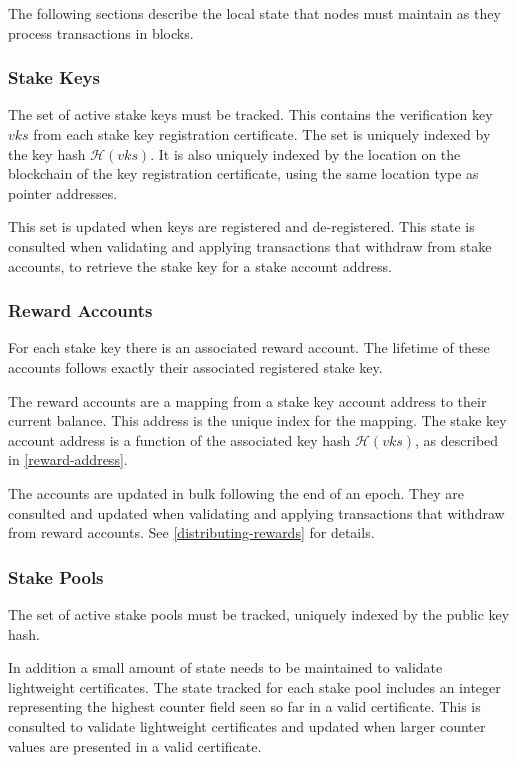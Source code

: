 \documentclass[11pt,a4paper]{article}
\begin{document}
The following sections describe the local state that nodes must maintain
as they process transactions in blocks.

\subsubsection{Stake Keys}
\label{stake-keys}

The set of active stake keys must be tracked. This contains the
verification key \(vks\) from each stake key registration certificate.
The set is uniquely indexed by the key hash \(\mathcal{H}(vks)\). It is
also uniquely indexed by the location on the blockchain of the key
registration certificate, using the same location type as pointer
addresses.

This set is updated when keys are registered and de-registered. This
state is consulted when validating and applying transactions that
withdraw from stake accounts, to retrieve the stake key for a stake
account address.

\subsubsection{Reward Accounts}
\label{reward-accounts}

For each stake key there is an associated reward account. The lifetime of
these accounts follows exactly their associated registered stake key.

The reward accounts are a mapping from a stake key account address to
their current balance. This address is the unique index for the mapping.
The stake key account address is a function of the associated key hash
\(\mathcal{H}(vks)\), as described in \cref{reward-address}.

The accounts are updated in bulk following the end of an epoch. They are
consulted and updated when validating and applying transactions that
withdraw from reward accounts. See \cref{distributing-rewards} for
details.

\subsubsection{Stake Pools}
\label{stake-pools}

The set of active stake pools must be tracked, uniquely indexed
by the public key hash.

In addition a small amount of state needs to be maintained to validate
lightweight certificates. The state tracked for each stake pool includes
an integer representing the highest counter field seen so far in a valid
certificate. This is consulted to validate lightweight certificates and
updated when larger counter values are presented in a valid certificate.
\end{document}
